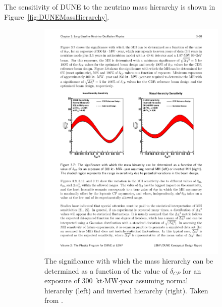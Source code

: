 The sensitivity of DUNE to the neutrino mass hierarchy is shown in Figure~\ref{fig:DUNEMassHierarchy}.

\begin{figure}
  \centering
  \begin{subfigure}[t]{\linewidth}
    \centering
    \includegraphics[width=16cm]{DUNEMassHierarchyDeltaCP.pdf}
    \caption{The significance with which the mass hierarchy can be determined as a function of the value of $\delta_{CP}$ for an exposure of 300~kt$\cdot$MW$\cdot$year assuming normal hierarchy (left) and inverted hierarchy (right).  Taken from \cite{DUNECDR2}.}
    \label{fig:DUNEMassHierarchyDeltaCP}
  \end{subfigure}
  \hfill
  \vfill
  \begin{subfigure}[t]{\linewidth}
    \centering

\end{subfigure}
\end{figure}
